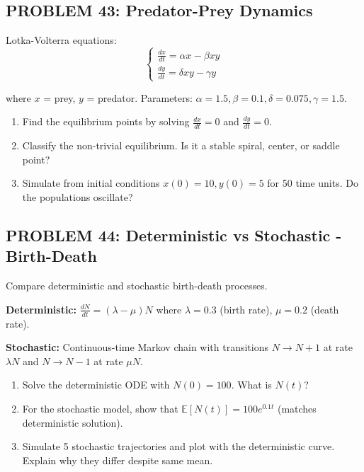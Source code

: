 \documentclass[12pt]{article}
\begin{document}
\subsection*{PROBLEM 43: Predator-Prey Dynamics}

Lotka-Volterra equations:
\[
\begin{cases}
\frac{dx}{dt} = \alpha x - \beta xy \\
\frac{dy}{dt} = \delta xy - \gamma y
\end{cases}
\]

where \(x\) = prey, \(y\) = predator. Parameters: \(\alpha = 1.5, \beta = 0.1, \delta = 0.075, \gamma = 1.5\).

\begin{enumerate}
\item[(a)] Find the equilibrium points by solving \(\frac{dx}{dt} = 0\) and \(\frac{dy}{dt} = 0\).
\item[(b)] Classify the non-trivial equilibrium. Is it a stable spiral, center, or saddle point?
\item[(c)] Simulate from initial conditions \(x(0) = 10, y(0) = 5\) for 50 time units. Do the populations oscillate?
\end{enumerate}

\subsection*{PROBLEM 44: Deterministic vs Stochastic - Birth-Death}

Compare deterministic and stochastic birth-death processes.

\textbf{Deterministic:} \(\frac{dN}{dt} = (\lambda - \mu)N\) where \(\lambda = 0.3\) (birth rate), \(\mu = 0.2\) (death rate).

\textbf{Stochastic:} Continuous-time Markov chain with transitions \(N \to N+1\) at rate \(\lambda N\) and \(N \to N-1\) at rate \(\mu N\).

\begin{enumerate}
\item[(a)] Solve the deterministic ODE with \(N(0) = 100\). What is \(N(t)\)?
\item[(b)] For the stochastic model, show that \(\mathbb{E}[N(t)] = 100e^{0.1t}\) (matches deterministic solution).
\item[(c)] Simulate 5 stochastic trajectories and plot with the deterministic curve. Explain why they differ despite same mean.
\end{enumerate}
\end{document}
